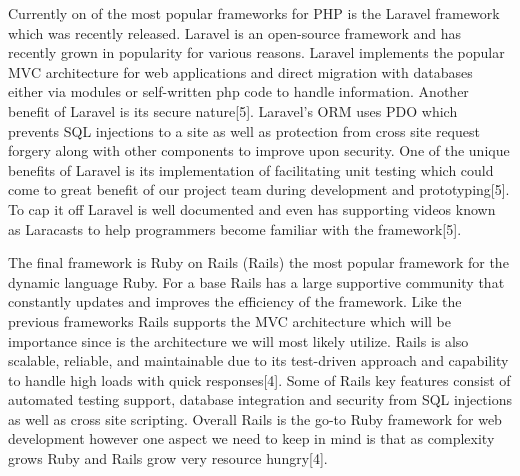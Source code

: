 \documentclass[letterpaper, 10pt, draftclsnofoot,onecolumn]{IEEEtran}
\begin{document}
Currently on of the most popular frameworks for PHP is the Laravel framework which was recently released. Laravel is an open-source framework and has recently grown in popularity for various reasons. Laravel implements the popular MVC architecture for web applications and direct migration with databases either via modules or self-written php code to handle information. Another benefit of Laravel is its secure nature[5]. Laravel’s ORM uses PDO which prevents SQL injections to a site as well as protection from cross site request forgery along with other components to improve upon security. One of the unique benefits of Laravel is its implementation of facilitating unit testing which could come to great benefit of our project team during development and prototyping[5].  To cap it off Laravel is well documented and even has supporting videos known as Laracasts to help programmers become familiar with the framework[5]. 

The final framework is Ruby on Rails (Rails) the most popular framework for the dynamic language Ruby. For a base Rails has a large supportive community that constantly updates and improves the efficiency of the framework. Like the previous frameworks Rails supports the MVC architecture which will be importance since is the architecture we will most likely utilize. Rails is also scalable, reliable, and maintainable due to its test-driven approach and capability to handle high loads with quick responses[4]. Some of Rails key features consist of automated testing support, database integration and security from SQL injections as well as cross site scripting. Overall Rails is the go-to Ruby framework for web development however one aspect we need to keep in mind is that as complexity grows Ruby and Rails grow very resource hungry[4]. 
\end{document}
